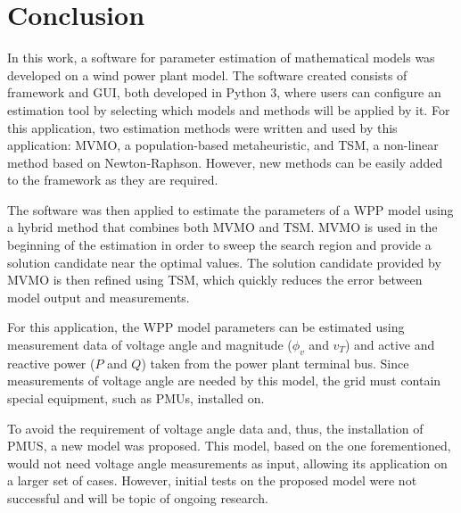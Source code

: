 \chapter{Conclusion}
\label{ch: Conclusion}

In this work, a software for parameter estimation of mathematical models was developed on a wind power plant model. The software created consists of framework and GUI, both developed in Python 3, where users can configure an estimation tool by selecting which models and methods will be applied by it. For this application, two estimation methods were written and used by this application: MVMO, a population-based metaheuristic, and TSM, a non-linear method based on Newton-Raphson. However, new methods can be easily added to the framework as they are required. 

The software was then applied to estimate the parameters of a WPP model using a hybrid method that combines both MVMO and TSM. MVMO is used in the beginning of the estimation in order to sweep the search region and provide a solution candidate near the optimal values. The solution candidate provided by MVMO is then refined using TSM, which quickly reduces the error between model output and measurements. 

For this application, the WPP model parameters can be estimated using measurement data of voltage angle and magnitude ($\phi_{v}$ and $v_{T}$) and active and reactive power ($P$ and $Q$) taken from the power plant terminal bus. Since measurements of voltage angle are needed by this model, the grid must contain special equipment, such as PMUs, installed on.

To avoid the requirement of voltage angle data and, thus, the installation of PMUS, a new model was proposed. This model, based on the one forementioned, would not need voltage angle measurements as input, allowing its application on a larger set of cases. However, initial tests on the proposed model were not successful and will be topic of ongoing research.